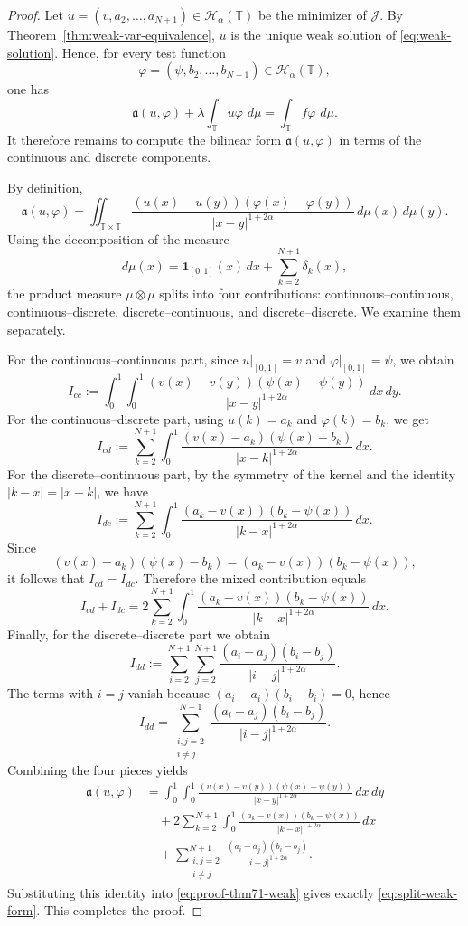 \documentclass[10pt,a4paper]{amsart}
\newcommand{\HH}{\mathcal{H}}
\newcommand{\JJ}{\mathcal{J}}
\newcommand{\T}{\mathbb{T}}
\newcommand{\abs}[1]{\lvert#1\rvert}
\newcommand{\ddmu}{\,d\mu}
\begin{document}
\begin{proof}
Let $u=(v,a_2,\dots,a_{N+1})\in\HH_\alpha(\T)$ be the minimizer of $\JJ$. By Theorem~\ref{thm:weak-var-equivalence}, $u$ is the unique weak solution of \eqref{eq:weak-solution}. Hence, for every test function
\[
\varphi=(\psi,b_2,\dots,b_{N+1})\in\HH_\alpha(\T),
\]
one has
\begin{equation}\label{eq:proof-thm71-weak}
\mathfrak a(u,\varphi)+\lambda\int_{\T}u\varphi\,\ddmu=\int_{\T}f\varphi\,\ddmu.
\end{equation}
It therefore remains to compute the bilinear form $\mathfrak a(u,\varphi)$ in terms of the continuous and discrete components.

By definition,
\[
\mathfrak a(u,\varphi)=\iint_{\T\times\T}
\frac{(u(x)-u(y))(\varphi(x)-\varphi(y))}{\abs{x-y}^{1+2\alpha}}\,d\mu(x)\,d\mu(y).
\]
Using the decomposition of the measure
\[
d\mu(x)=\mathbf 1_{[0,1]}(x)\,dx+\sum_{k=2}^{N+1}\delta_k(x),
\]
the product measure $\mu\otimes\mu$ splits into four contributions:
continuous--continuous, continuous--discrete, discrete--continuous, and discrete--discrete. We examine them separately.

For the continuous--continuous part, since $u|_{[0,1]}=v$ and $\varphi|_{[0,1]}=\psi$, we obtain
\[
I_{cc}:=\int_0^1\int_0^1
\frac{(v(x)-v(y))(\psi(x)-\psi(y))}{\abs{x-y}^{1+2\alpha}}\,dx\,dy.
\]
For the continuous--discrete part, using $u(k)=a_k$ and $\varphi(k)=b_k$, we get
\[
I_{cd}:=\sum_{k=2}^{N+1}\int_0^1
\frac{(v(x)-a_k)(\psi(x)-b_k)}{\abs{x-k}^{1+2\alpha}}\,dx.
\]
For the discrete--continuous part, by the symmetry of the kernel and the identity $\abs{k-x}=\abs{x-k}$, we have
\[
I_{dc}:=\sum_{k=2}^{N+1}\int_0^1
\frac{(a_k-v(x))(b_k-\psi(x))}{\abs{k-x}^{1+2\alpha}}\,dx.
\]
Since
\[
(v(x)-a_k)(\psi(x)-b_k)=(a_k-v(x))(b_k-\psi(x)),
\]
it follows that $I_{cd}=I_{dc}$. Therefore the mixed contribution equals
\[
I_{cd}+I_{dc}=2\sum_{k=2}^{N+1}\int_0^1
\frac{(a_k-v(x))(b_k-\psi(x))}{\abs{k-x}^{1+2\alpha}}\,dx.
\]
Finally, for the discrete--discrete part we obtain
\[
I_{dd}:=\sum_{i=2}^{N+1}\sum_{j=2}^{N+1}
\frac{(a_i-a_j)(b_i-b_j)}{\abs{i-j}^{1+2\alpha}}.
\]
The terms with $i=j$ vanish because $(a_i-a_i)(b_i-b_i)=0$, hence
\[
I_{dd}=\sum_{\substack{i,j=2\\ i\neq j}}^{N+1}
\frac{(a_i-a_j)(b_i-b_j)}{\abs{i-j}^{1+2\alpha}}.
\]
Combining the four pieces yields
\begin{align*}
\mathfrak a(u,\varphi)
&=\int_0^1\int_0^1
\frac{(v(x)-v(y))(\psi(x)-\psi(y))}{\abs{x-y}^{1+2\alpha}}\,dx\,dy\\
&\quad+2\sum_{k=2}^{N+1}\int_0^1
\frac{(a_k-v(x))(b_k-\psi(x))}{\abs{k-x}^{1+2\alpha}}\,dx\\
&\quad+\sum_{\substack{i,j=2\\ i\neq j}}^{N+1}
\frac{(a_i-a_j)(b_i-b_j)}{\abs{i-j}^{1+2\alpha}}.
\end{align*}
Substituting this identity into \eqref{eq:proof-thm71-weak} gives exactly \eqref{eq:split-weak-form}. This completes the proof.
\end{proof}
\end{document}
